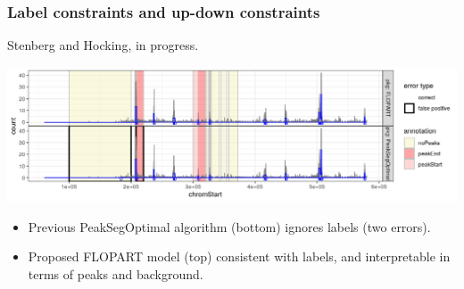 \documentclass{beamer}
\begin{document}
\begin{frame}
  \frametitle{Label constraints and up-down constraints}
  Stenberg and Hocking, in progress.

  \includegraphics[width=\linewidth]{FLOPART-example}

  \begin{itemize}
  \item Previous PeakSegOptimal algorithm (bottom) ignores labels (two
    errors).
  \item Proposed FLOPART model (top) consistent with labels, and
    interpretable in terms of peaks and background.
  \end{itemize}
\end{frame}


\end{document}
